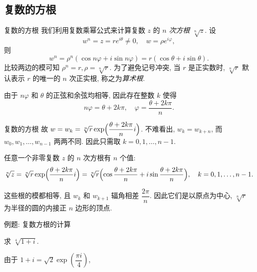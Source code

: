 \subsection{复数的方根}
\begin{frame}{复数的方根}
	\onslide<+->
	我们利用复数乘幂公式来计算复数 $z$ 的 \emph{$n$ 次方根 $\sqrt[n]z$}.
	\onslide<+->
	设
	\[w^n=z=re^{i\theta}\neq0,\quad w=\rho e^{i\varphi},\]
	\onslide<+->
	则
	\[w^n=\rho^n(\cos{n\varphi}+i\sin{n\varphi})=r(\cos\theta+i\sin\theta).\]
	\onslide<+->
	比较两边的模可知 $\rho^n=r,\rho=\sqrt[n]r$.
	\onslide<+->
	为了避免记号冲突, 当 $r$ 是正实数时, $\sqrt[n]r$ 默认表示 $r$ 的唯一的 $n$ 次正实根, 称之为\emph{算术根}.

	\onslide<+->
	由于 $n\varphi$ 和 $\theta$ 的正弦和余弦均相等, 因此存在整数 $k$ 使得
	\[n\varphi=\theta+2k\pi,\quad \varphi=\frac{\theta+2k\pi}n.\]
\end{frame}


\begin{frame}{复数的方根}
	\onslide<+->
	故 $w=w_k=\sqrt[n]r\exp\Bigl(\dfrac{\theta+2k\pi}ni\Bigr)$.
	\onslide<+->
	不难看出, $w_k=w_{k+n}$, 而 $w_0,w_1,\dots,w_{n-1}$ 两两不同.
	因此只需取 $k=0,1,\dots,n-1$.
	\onslide<+->
	\begin{theorem}[复数的方根]
		任意一个非零复数 $z$ 的 $n$ 次方根有 $n$ 个值:
		\[
			\sqrt[n]z=\sqrt[n]r\exp\Bigl(\dfrac{\theta+2k\pi}ni\Bigr)\\
				=\sqrt[n]r\Bigl(\cos\frac{\theta+2k\pi}n+i\sin\frac{\theta+2k\pi}n\Bigr),\quad k=0,1,\dots,n-1.
		\]
	\end{theorem}
	\onslide<+->
	这些根的模都相等, 且 $w_k$ 和 $w_{k+1}$ 辐角相差 $\dfrac{2\pi}n$.
	\onslide<+->
	因此\alert{它们是以原点为中心, $\sqrt[n]r$ 为半径的圆的内接正 $n$ 边形的顶点}.
\end{frame}


\begin{frame}{例题: 复数方根的计算}
	\onslide<+->
	\begin{example}
		求 $\sqrt[4]{1+i}$.
	\end{example}

	\onslide<+->
	\begin{solution}
		由于 $1+i=\sqrt2\exp\left(\dfrac{\pi i}4\right)$,
		\onslide<+->{%
			于是该方根所有值为
			\[w_0=\sqrt[8]2e^{\frac{\pi i}{16}},\quad
			w_1=\sqrt[8]2e^{\frac{9\pi i}{16}},\quad
			w_2=\sqrt[8]2e^{\frac{17\pi i}{16}},\quad
			w_3=\sqrt[8]2e^{\frac{25\pi i}{16}}.\]
		}
		\vspace{-\baselineskip}
	\end{solution}
\end{frame}


